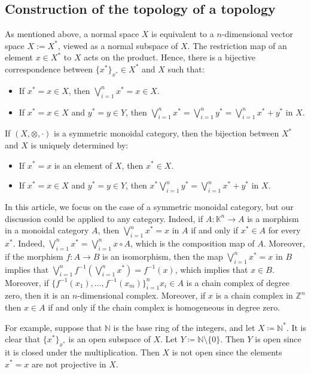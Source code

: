 \documentclass[a4paper,reqno,oneside]{article}
\begin{document}
\subsection{Construction of the topology of a topology} 
As mentioned above, a normal space $X$ is equivalent to a $n$-dimensional vector space $X:=X^*$, viewed as a normal subspace of $X$. The restriction map of an element $x\in X^*$ to $X$ acts on the product. Hence, there is a bijective correspondence between $\{x^*\}_{x^*}\in X^*$ and $X$ such that:
\begin{itemize}
  \item If $x^*=x\in X$, then $\bigvee_{i=1}^n x^*=x\in X$.
  \item If $x^*=x\in X$ and $y^*=y\in Y$, then $\bigvee_{i=1}^n x^*=\bigvee_{i=1}^n y^*=\bigvee_{i=1}^n x^*+y^*$ in $X$.
\end{itemize}
If $(X,\otimes,\cdot)$ is a symmetric monoidal category, then the bijection between $X^*$ and $X$ is uniquely determined by:
\begin{itemize}
  \item If $x^*=x$ is an element of $X$, then $x^*\in X$.
  \item If $x^*=x\in X$ and $y^*=y\in Y$, then $x^*\bigvee_{i=1}^n y^*=\bigvee_{i=1}^n x^*+y^*$ in $X$.
\end{itemize}
In this article, we focus on the case of a symmetric monoidal category, but our discussion could be applied to any category. Indeed, if $A:\mathbb{K}^n\to A$ is a morphism in a monoidal category $A$, then $\bigvee_{i=1}^n x^*=x$ in $A$ if and only if $x^*\in A$ for every $x^*$.  Indeed, $\bigvee_{i=1}^n x^*=\bigvee_{i=1}^n x\circ A$, which is the composition map of $A$.  Moreover, if the morphism $f:A\to B$ is an isomorphism, then the map $\bigvee_{i=1}^n x^*=x$ in $B$ implies that $\bigvee_{i=1}^n f^{-1}(\bigvee_{i=1}^n x^*)=f^{-1}(x)$, which implies that $x\in B$. Moreover, if $\{f^{-1}(x_1),\ldots,f^{-1}(x_m)\}_{i=1}^n x_i\in A$ is a chain complex of degree zero, then it is an $n$-dimensional complex. Moreover, if $x$ is a chain complex in $\mathbb{Z}^n$ then $x\in A$ if and only if the chain complex is homogeneous in degree zero. 

For example, suppose that $\mathbb{N}$ is the base ring of the integers, and let $X\coloneqq\mathbb{N}^*$. It is clear that $\{x^*\}_{x^*}$ is an open subspace of $X$. Let $Y\coloneqq\mathbb{N}\setminus\{0\}$. Then $Y$ is open since it is closed under the multiplication. Then $X$ is not open since the elements $x^*=x$ are not projective in $X$. 
\end{document}
